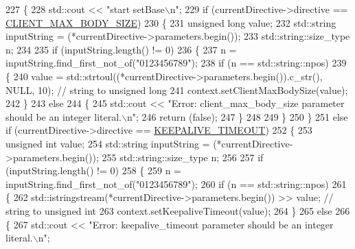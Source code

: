 \begin{DoxyCode}
227     \{
228         std::cout << \textcolor{stringliteral}{"start setBase\(\backslash\)n"};
229         \textcolor{keywordflow}{if} (currentDirective->directive == \hyperlink{namespaceft_a5a5554dff10f0dc50bae4cc5825ad75da026a7fa9f276b046081164564a62a6d6}{CLIENT\_MAX\_BODY\_SIZE})
230         \{
231             \textcolor{keywordtype}{unsigned} \textcolor{keywordtype}{long}       value;
232             std::string     inputString = (*currentDirective->parameters.begin());
233             std::string::size\_type  n;
234 
235             \textcolor{keywordflow}{if} (inputString.length() != 0)
236             \{
237                 n = inputString.find\_first\_not\_of(\textcolor{stringliteral}{"0123456789"});
238                 \textcolor{keywordflow}{if} (n == std::string::npos)
239                 \{   
240                     value = std::strtoul((*currentDirective->parameters.begin()).c\_str(), NULL, 10); \textcolor{comment}{//
       string to unsigned long}
241                     context.setClientMaxBodySize(value); 
242                 \}
243                 \textcolor{keywordflow}{else}
244                 \{
245                     std::cout << \textcolor{stringliteral}{"Error: client\_max\_body\_size parameter should be an integer literal.\(\backslash\)n"};
246                     \textcolor{keywordflow}{return} (\textcolor{keyword}{false});
247                 \}
248 
249             \}
250         \}
251         \textcolor{keywordflow}{else} \textcolor{keywordflow}{if} (currentDirective->directive == \hyperlink{namespaceft_a5a5554dff10f0dc50bae4cc5825ad75daaefe179bd74ff161beb62eb565186d89}{KEEPALIVE\_TIMEOUT})
252         \{
253             \textcolor{keywordtype}{unsigned} \textcolor{keywordtype}{int}        value;
254             std::string     inputString = (*currentDirective->parameters.begin());
255             std::string::size\_type  n;
256 
257             \textcolor{keywordflow}{if} (inputString.length() != 0)
258             \{
259                 n = inputString.find\_first\_not\_of(\textcolor{stringliteral}{"0123456789"});
260                 \textcolor{keywordflow}{if} (n == std::string::npos)
261                 \{   
262                     std::istringstream(*currentDirective->parameters.begin()) >> value; \textcolor{comment}{// string to
       unsigned int}
263                     context.setKeepaliveTimeout(value); 
264                 \}
265                 \textcolor{keywordflow}{else}
266                 \{
267                     std::cout << \textcolor{stringliteral}{"Error: keepalive\_timeout parameter should be an integer literal.\(\backslash\)n"};

\end{DoxyCode}
